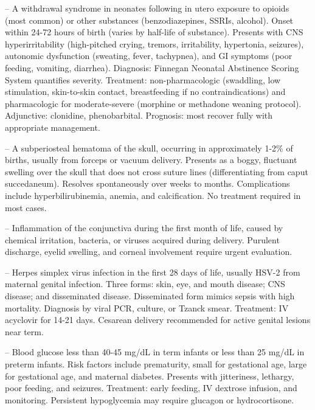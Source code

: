-- A withdrawal syndrome in neonates following in utero exposure to opioids (most common) or other substances (benzodiazepines, SSRIs, alcohol). Onset within 24-72 hours of birth (varies by half-life of substance). Presents with CNS hyperirritability (high-pitched crying, tremors, irritability, hypertonia, seizures), autonomic dysfunction (sweating, fever, tachypnea), and GI symptoms (poor feeding, vomiting, diarrhea). Diagnosis: Finnegan Neonatal Abstinence Scoring System quantifies severity. Treatment: non-pharmacologic (swaddling, low stimulation, skin-to-skin contact, breastfeeding if no contraindications) and pharmacologic for moderate-severe (morphine or methadone weaning protocol). Adjunctive: clonidine, phenobarbital. Prognosis: most recover fully with appropriate management.

-- A subperiosteal hematoma of the skull, occurring in approximately 1-2\% of births, usually from forceps or vacuum delivery. Presents as a boggy, fluctuant swelling over the skull that does not cross suture lines (differentiating from caput succedaneum). Resolves spontaneously over weeks to months. Complications include hyperbilirubinemia, anemia, and calcification. No treatment required in most cases.

-- Inflammation of the conjunctiva during the first month of life, caused by chemical irritation, bacteria, or viruses acquired during delivery. Purulent discharge, eyelid swelling, and corneal involvement require urgent evaluation.

-- Herpes simplex virus infection in the first 28 days of life, usually HSV-2 from maternal genital infection. Three forms: skin, eye, and mouth disease; CNS disease; and disseminated disease. Disseminated form mimics sepsis with high mortality. Diagnosis by viral PCR, culture, or Tzanck smear. Treatment: IV acyclovir for 14-21 days. Cesarean delivery recommended for active genital lesions near term.

-- Blood glucose less than 40-45 mg/dL in term infants or less than 25 mg/dL in preterm infants. Risk factors include prematurity, small for gestational age, large for gestational age, and maternal diabetes. Presents with jitteriness, lethargy, poor feeding, and seizures. Treatment: early feeding, IV dextrose infusion, and monitoring. Persistent hypoglycemia may require glucagon or hydrocortisone.

